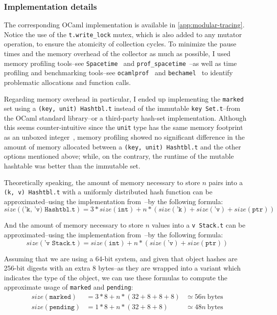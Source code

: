 

\subsubsection{Implementation details}

The corresponding OCaml implementation is available in \cref{app:modular-tracing}. Notice the use of the \texttt{t.write\_lock} mutex, which is also added to any mutator operation, to ensure the atomicity of collection cycles. To minimize the pause times and the memory overhead of the collector as much as possible, I used memory profiling tools--see \texttt{Spacetime}~\cite{spacetime} and \texttt{prof\_spacetime}~\cite{prof-spacetime}--as well as time profiling and benchmarking tools--see \texttt{ocamlprof}~\cite{ocamlprof} and \texttt{bechamel}~\cite{bechamel} to identify problematic allocations and function calls.

Regarding memory overhead in particular, I ended up implementing the \texttt{marked} set using a \texttt{(key,\ unit)\ Hashtbl.t} instead of the immutable \texttt{key\ Set.t}--from the OCaml standard library--or a third-party hash-set implementation. Although this seems counter-intuitive since the \texttt{unit} type has the same memory footprint as an unboxed integer~\cite{ocaml-layout}, memory profiling showed no significant difference in the amount of memory allocated between a \texttt{(key,\ unit)\
  Hashtbl.t} and the other options mentioned above; while, on the contrary, the runtime of the mutable hashtable was better than the immutable set.


\bigskip
Theoretically speaking, the amount of memory necessary to store \(n\) pairs into a \texttt{(\textquotesingle{}k,\ \textquotesingle{}v)\ Hashtbl.t} with a uniformly distributed hash function can be approximated--using the implementation from~\cite{impl-hashtbl}--by the following formula: \[
  size(\texttt{('k, 'v) Hashtbl.t}) = 3 * size(\texttt{int}) + n * (size(\texttt{'k}) + size(\texttt{'v}) + size(\texttt{ptr}))
\]

And the amount of memory necessary to store \(n\) values into a \texttt{\textquotesingle{}v\ Stack.t} can be approximated--using the implementation from~\cite{impl-stack}--by the following formula: \[
  size(\texttt{'v Stack.t}) = size(\texttt{int}) + n * (size(\texttt{'v}) + size(\texttt{ptr}))
\]

Assuming that we are using a 64-bit system, and given that object hashes are 256-bit digests with an extra 8 bytes--as they are wrapped into a variant which indicates the type of the object, we can use these formulas to compute the approximate usage of \texttt{marked} and \texttt{pending}: \[
  \begin{array}{lll}
    size(\texttt{marked})  & = 3*8 + n * (32 + 8 + 8 + 8) & \simeq 56 n \
    \text{bytes}
    \\
    size(\texttt{pending}) & = 1*8 + n * (32 + 8 + 8)     & \simeq 48 n \
    \text{bytes}
    \\
  \end{array}
\]

